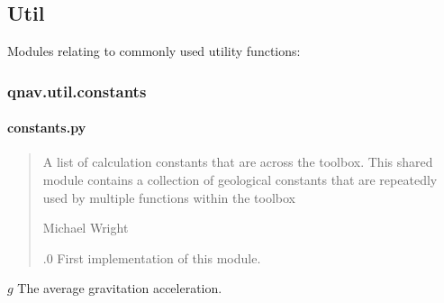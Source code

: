 \documentclass[letterpaper,10pt,english]{sphinxmanual}
\begin{document}
\subsection{Util}
\label{\detokenize{usage/packages:util}}
\sphinxAtStartPar
Modules relating to commonly used utility functions:

\sphinxstepscope


\subsubsection{qnav.util.constants}
\label{\detokenize{modules/util/constants:module-qnav.util.constants}}\label{\detokenize{modules/util/constants:qnav-util-constants}}\label{\detokenize{modules/util/constants::doc}}

\paragraph{constants.py}
\label{\detokenize{modules/util/constants:constants-py}}\begin{quote}\begin{description}
\sphinxAtStartPar
A list of calculation constants that are across the toolbox.
This shared module contains a collection of geological constants that are
repeatedly used by multiple functions within the toolbox

\sphinxAtStartPar
Michael Wright \sphinxhyphen{} 

.0 \sphinxhyphen{} First implementation of this module.

\end{description}\end{quote}

\begin{fulllineitems}
\label{\detokenize{modules/util/constants:qnav.util.constants.G}}
\pysigstartsignatures
{}
\pysigstopsignatures
\sphinxAtStartPar
\(g\) \sphinxhyphen{} The average gravitation acceleration.

\end{fulllineitems}
\end{document}
